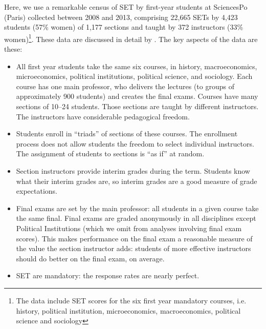 \documentclass[12pt]{article}
\begin{document}
Here, we use a remarkable census of SET by first-year students at SciencesPo (Paris)
collected between 2008 and 2013, 
comprising 22,665 SETs by
4,423 students (57\% women) of 1,177
sections and  taught by 372 instructors (33\% women)\footnote{The data include SET scores for the six first year mandatory courses, i.e. history, political institution, microeconomics, macroeconomics, political science and sociology}.
These data are discussed in detail by \citet{Boring2015}.
The key aspects of the data are these:
\begin{itemize}
   \item All first year students take the same six courses, in history, macroeconomics, microeconomics, 
            political institutions, political science, and sociology.
            Each course has one main professor,
            who delivers the lectures (to groups of approximately 900 students) and creates 
            the final exams.
            Courses have many sections of 10--24 students. 
            Those sections are taught by different instructors.
            The instructors have considerable pedagogical freedom.
    
   \item Students enroll in ``triads'' of sections of these courses. 
            The enrollment process
            does not allow students the freedom to select individual instructors.
            The assignment of students to sections is ``as if'' at random.
            
   \item Section instructors provide interim grades during the term. 
            Students know what their interim grades are, so interim grades are a 
            good measure of grade expectations.
            
   \item Final exams are set by the main professor: all students in a given course take the
            same final. Final exams are graded anonymously in all disciplines except Political
            Institutions (which we omit from analyses involving final exam scores).
            This makes performance on the final exam a reasonable measure of the value the
            section instructor adds: students of more effective instructors should do better on
            the final exam, on average.
    
   \item SET are mandatory: the response rates are nearly perfect.
   
\end{itemize}
\end{document}
